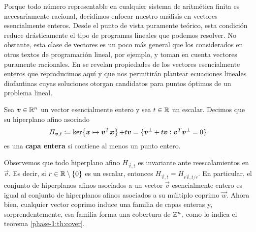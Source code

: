 Porque todo número representable en cualquier sistema de aritmética finita es necesariamente
racional, decidimos enfocar nuestro análisis en vectores esencialmente enteros. Desde el punto de
vista puramente teórico, esta condición reduce drásticamente el tipo de programas lineales que
podemos resolver. No obstante, esta clase de vectores es un poco más general que los considerados en
otros textos de programación lineal, por ejemplo, \cite{martello} y \cite{alex} toman en cuenta
vectores puramente racionales. En \cite{herr} se revelan propiedades de los vectores esencialmente
enteros que reproducimos aquí y que nos permitirán plantear ecuaciones lineales diofantinas cuyas
soluciones otorgan candidatos para puntos óptimos de un problema lineal.

\begin{definition}
	\label{phase-1:def:c-layer}
	Sea $\boldsymbol{v} \in \mathbb{R}^n$ un vector esencialmente entero y sea $t \in \mathbb{R}$ un escalar. Decimos que
	su hiperplano afino asociado
	\begin{equation}
		\label{phase-1:def:affine-hyperplane}
		H_{\vec{v}, t} \coloneq \ker{\vec{x} \mapsto \vec{v}^T\vec{x}} + t\vec{v}
		= \lbrace \vec{v}^{\perp} + t\vec{v} \vcentcolon \vec{v}^T\vec{v}^{\perp} = 0 \rbrace
	\end{equation}
	es una \textbf{capa entera} si contiene al menos un punto entero.
\end{definition}
Observemos que todo hiperplano afino $H_{\vec{v}, t}$ es invariante ante reescalamientos en
$\vec{v}$. Es decir, si $r \in \mathbb{R} \setminus \lbrace 0 \rbrace$ es un escalar, entonces $H_{\vec{v},
t} = H_{r\vec{v}, t/r}$. En particular, el conjunto de hiperplanos afinos asociados a un vector
$\vec{v}$ esencialmente entero es igual al conjunto de hiperplanos afinos asociados a su múltiplo
coprimo $\vec{w}$. Ahora bien, cualquier vector coprimo induce una familia de capas enteras y,
sorprendentemente, esa familia forma una cobertura de $\mathbb{Z}^n$, como lo indica el teorema
\ref{phase-1:th:cover}.

